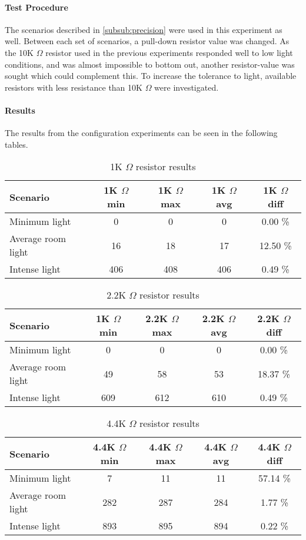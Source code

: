 \paragraph{Test Procedure}
The scenarios described in \cref{subsub:precision} were used in this experiment as well. Between each set of scenarios, a pull-down resistor value was changed. As the 10K $\Omega$ resistor used in the previous experiments responded well to low light conditions, and was almost impossible to bottom out, another resistor-value was sought which could complement this. To increase the tolerance to light, available resistors with less resistance than 10K $\Omega$ were investigated.
\paragraph{Results}
The results from the configuration experiments can be seen in the following tables.
\begin{table}[H]
  \begin{tabular}{l c c c c}
    Scenario & 1K $\Omega$ min & 1K $\Omega$ max & 1K $\Omega$ avg & 1K $\Omega$ diff \\
    \hline
    Minimum light & 0 & 0 & 0 & 0.00 \% \\
    Average room light & 16 & 18 & 17 & 12.50 \% \\
    Intense light & 406 & 408 & 406 & 0.49 \% \\
  \end{tabular}
  \label{tab:1KTestResults}
  \caption{1K $\Omega$ resistor results}
\end{table}
\begin{table}[H]
  \begin{tabular}{l c c c c}
    Scenario & 1K $\Omega$ min & 2.2K $\Omega$ max & 2.2K $\Omega$ avg & 2.2K $\Omega$ diff \\
    \hline
    Minimum light & 0 & 0 & 0 & 0.00 \% \\
    Average room light & 49 & 58 & 53 & 18.37 \% \\
    Intense light & 609 & 612 & 610 & 0.49 \% \\
  \end{tabular}
  \label{tab:2,2KTestResults}
  \caption{2.2K $\Omega$ resistor results}
\end{table}
\begin{table}[H]
  \begin{tabular}{l c c c c}
    Scenario & 4.4K $\Omega$ min & 4.4K $\Omega$ max & 4.4K $\Omega$ avg & 4.4K $\Omega$ diff \\
    \hline
    Minimum light & 7 & 11 & 11 & 57.14 \% \\
    Average room light & 282 & 287 & 284 & 1.77 \% \\
    Intense light & 893 & 895 & 894 & 0.22 \% \\
  \end{tabular}
  \label{tab:4,4KTestResults}
  \caption{4.4K $\Omega$ resistor results}
\end{table}
